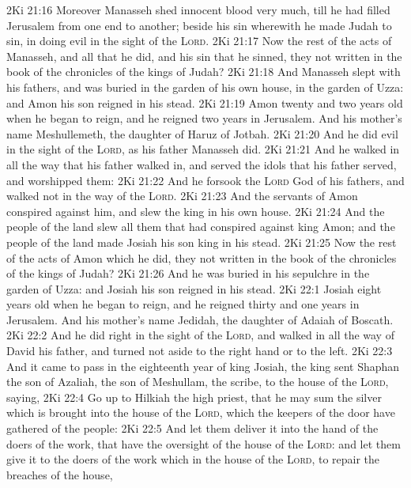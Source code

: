 \vs 2Ki 21:16 Moreover Manasseh shed innocent blood very much, till he had filled Jerusalem from one end to another; beside his sin wherewith he made Judah to sin, in doing  evil in the sight of the \textsc{Lord}.
\vs 2Ki 21:17 Now the rest of the acts of Manasseh, and all that he did, and his sin that he sinned,  they not written in the book of the chronicles of the kings of Judah?
\vs 2Ki 21:18 And Manasseh slept with his fathers, and was buried in the garden of his own house, in the garden of Uzza: and Amon his son reigned in his stead.
\vs 2Ki 21:19 Amon  twenty and two years old when he began to reign, and he reigned two years in Jerusalem. And his mother's name  Meshullemeth, the daughter of Haruz of Jotbah.
\vs 2Ki 21:20 And he did  evil in the sight of the \textsc{Lord}, as his father Manasseh did.
\vs 2Ki 21:21 And he walked in all the way that his father walked in, and served the idols that his father served, and worshipped them:
\vs 2Ki 21:22 And he forsook the \textsc{Lord} God of his fathers, and walked not in the way of the \textsc{Lord}.
\vs 2Ki 21:23 And the servants of Amon conspired against him, and slew the king in his own house.
\vs 2Ki 21:24 And the people of the land slew all them that had conspired against king Amon; and the people of the land made Josiah his son king in his stead.
\vs 2Ki 21:25 Now the rest of the acts of Amon which he did,  they not written in the book of the chronicles of the kings of Judah?
\vs 2Ki 21:26 And he was buried in his sepulchre in the garden of Uzza: and Josiah his son reigned in his stead.
\vs 2Ki 22:1 Josiah  eight years old when he began to reign, and he reigned thirty and one years in Jerusalem. And his mother's name  Jedidah, the daughter of Adaiah of Boscath.
\vs 2Ki 22:2 And he did  right in the sight of the \textsc{Lord}, and walked in all the way of David his father, and turned not aside to the right hand or to the left.
\vs 2Ki 22:3 And it came to pass in the eighteenth year of king Josiah,  the king sent Shaphan the son of Azaliah, the son of Meshullam, the scribe, to the house of the \textsc{Lord}, saying,
\vs 2Ki 22:4 Go up to Hilkiah the high priest, that he may sum the silver which is brought into the house of the \textsc{Lord}, which the keepers of the door have gathered of the people:
\vs 2Ki 22:5 And let them deliver it into the hand of the doers of the work, that have the oversight of the house of the \textsc{Lord}: and let them give it to the doers of the work which  in the house of the \textsc{Lord}, to repair the breaches of the house,
